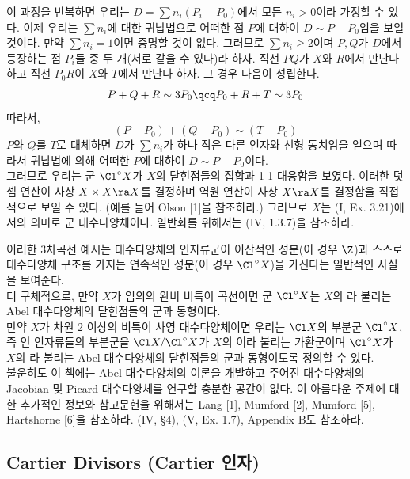 \begin{example}
	이 과정을 반복하면 우리는 $D=\sum n_i(P_i-P_0)$에서 모든 $n_i>0$이라 가정할 수 있다.
	이제 우리는 $\sum n_i$에 대한 귀납법으로 어떠한 점 $P$에 대하여 $D\sim P-P_0$임을 보일 것이다.
	만약 $\sum n_i=1$이면 증명할 것이 없다.
	그러므로 $\sum n_i\ge 2$이며 $P,Q$가 $D$에서 등장하는 점 $P_i$들 중 두 개(서로 같을 수 있다)라 하자.
	직선 $PQ$가 $X$와 $R$에서 만난다 하고 직선 $P_0R$이 $X$와 $T$에서 만난다 하자. 그 경우 다음이 성립한다.
	$$P+Q+R\sim 3P_0\qcq P_0+R+T\sim 3P_0$$
	따라서,
	$$(P-P_0)+(Q-P_0)\sim(T-P_0)$$
	$P$와 $Q$를 $T$로 대체하면 $D$가 $\sum n_i$가 하나 작은 다른 인자와 선형 동치임을 얻으며
	따라서 귀납법에 의해 어떠한 $P$에 대하여 $D\sim P-P_0$이다.\\
	그러므로 우리는 군 $\Cl^\circ X$가 $X$의 닫힌점들의 집합과 1-1 대응함을 보였다.
	이러한 덧셈 연산이 사상 $X\times X\ra X$를 결정하며 역원 연산이 사상 $X\ra X$를 결정함을 직접적으로 보일 수 있다.
	(예를 들어 Olson [1]을 참조하라.) 그러므로 $X$는 (I, Ex. 3.21)에서의 의미로 군 대수다양체이다.
	일반화를 위해서는 (IV, 1.3.7)을 참조하라.
	\end{example}
	
	
	\begin{remark}
	이러한 3차곡선 예시는 대수다양체의 인자류군이 이산적인 성분(이 경우 $\Z$)과
	스스로 대수다양체 구조를 가지는 연속적인 성분(이 경우 $\Cl^\circ X$)을 가진다는 일반적인 사실을 보여준다.\\
	더 구체적으로, 만약 $X$가 임의의 완비 비특이 곡선이면 군 $\Cl^\circ X$는
	$X$의 라 불리는 Abel 대수다양체의 닫힌점들의 군과 동형이다.\\
	만약 $X$가 차원 2 이상의 비특이 사영 대수다양체이면 우리는 $\Cl X$의 부분군 $\Cl^\circ X$,
	즉 인 인자류들의 부분군을
	$\Cl X/\Cl^\circ X$가 $X$의 이라 불리는 가환군이며
	$\Cl^\circ X$가 $X$의 라 불리는
	Abel 대수다양체의 닫힌점들의 군과 동형이도록 정의할 수 있다.\\
	불운히도 이 책에는 Abel 대수다양체의 이론을 개발하고 주어진 대수다양체의 Jacobian 및 Picard 대수다양체를 연구할 충분한 공간이 없다.
	이 아름다운 주제에 대한 추가적인 정보와 참고문헌을 위해서는 Lang [1], Mumford [2], Mumford [5], Hartshorne [6]을 참조하라.
	(IV, \S4), (V, Ex. 1.7), Appendix B도 참조하라.
	\end{remark}
	
	
	\subsection*{Cartier Divisors (Cartier 인자)}
	
